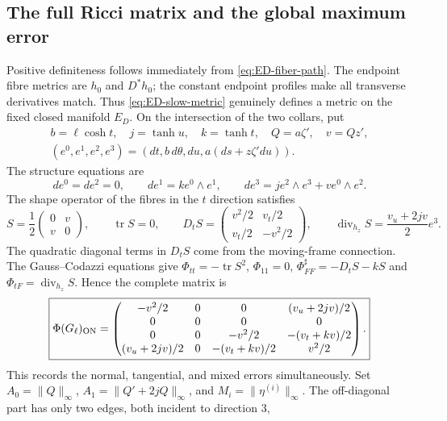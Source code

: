 \documentclass[a4paper,11pt]{article}
\numberwithin{equation}{section}
\theoremstyle{definition}
\newcommand{\tr}{\operatorname{tr}}
\begin{document}
\subsection{The full Ricci matrix and the global maximum error}\label{sec:ED-Ricci}
Positive definiteness follows immediately from \eqref{eq:ED-fiber-path}.
The endpoint fibre metrics are $h_0$ and $D^*h_0$; the constant endpoint profiles make all transverse derivatives match.
Thus \eqref{eq:ED-slow-metric} genuinely defines a metric on the fixed closed manifold $E_D$.
On the intersection of the two collars, put
\[
\begin{gathered}
b=\ell\cosh t,\quad j=\tanh u,\quad k=\tanh t,\quad
Q=a\zeta',\quad v=Qz',\\
(e^0,e^1,e^2,e^3)=(dt,b\,d\theta,du,a(ds+z\zeta' du)).
\end{gathered}
\]
The structure equations are
\begin{equation}\label{eq:ED-structure}
de^0=de^2=0,\qquad
de^1=k e^0\wedge e^1,\qquad
de^3=j e^2\wedge e^3+v e^0\wedge e^2.
\end{equation}
The shape operator of the fibres in the $t$ direction satisfies
\begin{equation}\label{eq:ED-shape}
S=\frac12\begin{pmatrix}0&v\\v&0\end{pmatrix},\qquad
\tr S=0,\qquad
D_tS=\begin{pmatrix}v^2/2&v_t/2\\v_t/2&-v^2/2\end{pmatrix},
\qquad
\operatorname{div}_{h_z}S=\frac{v_u+2jv}{2}e^3.
\end{equation}
The quadratic diagonal terms in $D_tS$ come from the moving-frame connection. The Gauss--Codazzi equations give
$\Phi_{tt}=-\tr S^2$, $\Phi_{11}=0$,
$\Phi_{FF}^{\sharp}=-D_tS-kS$ and
$\Phi_{tF}=\operatorname{div}_{h_z}S$. Hence the complete matrix is
\begin{equation}\label{eq:ED-ricci-matrix}
\boxed{\Phi(G_\ell)_{\rm ON}=
\begin{pmatrix}
-v^2/2&0&0&(v_u+2jv)/2\\
0&0&0&0\\
0&0&-v^2/2&-(v_t+kv)/2\\
(v_u+2jv)/2&0&-(v_t+kv)/2&v^2/2
\end{pmatrix}.}
\end{equation}
This records the normal, tangential, and mixed errors simultaneously.
Set $A_0=\|Q\|_\infty$, $A_1=\|Q'+2jQ\|_\infty$, and
$M_i=\|\eta^{(i)}\|_\infty$. The off-diagonal part has only two edges, both incident to direction $3$,
\end{document}
